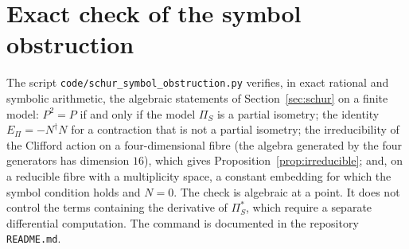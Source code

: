 \documentclass[11pt]{article}
\theoremstyle{definition}
\newcommand{\EPi}{E_\Pi}
\newcommand{\PiS}{\Pi_S}
\begin{document}
  \section{Exact check of the symbol obstruction}
    \label{sec:symbolcheck}

    The script \texttt{code/schur\_symbol\_obstruction.py} verifies, in exact rational and symbolic arithmetic, the
    algebraic statements of Section~\ref{sec:schur} on a finite model: $P^2=P$ if and only if the model $\PiS$ is a
    partial isometry; the identity $\EPi=-N^{\dagger}N$ for a contraction that is not a partial isometry; the
    irreducibility of the Clifford action on a four-dimensional fibre (the algebra generated by the four generators has
    dimension $16$), which gives Proposition~\ref{prop:irreducible}; and, on a reducible fibre with a multiplicity
    space, a constant embedding for which the symbol condition holds and $N=0$.
    The check is algebraic at a point.
    It does not control the terms containing the derivative of $\PiS^{*}$, which require a separate differential
    computation.
    The command is documented in the repository \texttt{README.md}.

    
    
\end{document}
